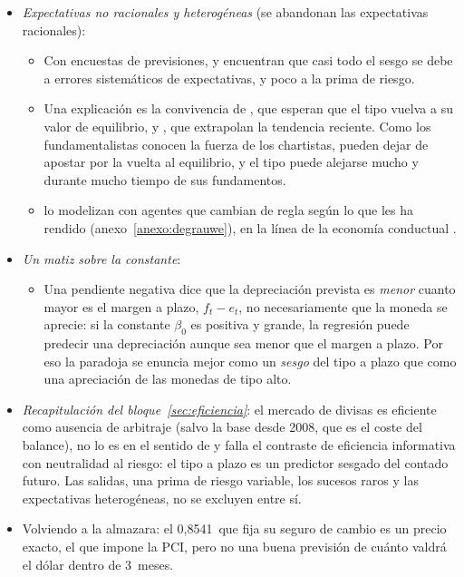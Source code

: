 \documentclass[11pt]{article}
\begin{document}
\begin{itemize}
\begin{itemize}
  \item Explica parte de las ganancias del \emph{carry trade}, que pagan el riesgo de un desplome raro pero grande\nocite{BurnsideEtAl2011Peso}.
  \end{itemize}
\item \emph{Expectativas no racionales y heterogéneas} (se abandonan las expectativas racionales):
  \begin{itemize}
  \item Con encuestas de previsiones, \textcite{FrankelFroot1987Survey} y \textcite{FrootFrankel1989Forward} encuentran que casi todo el sesgo se debe a errores sistemáticos de expectativas, y poco a la prima de riesgo.
  \item Una explicación es la convivencia de , que esperan que el tipo vuelva a su valor de equilibrio, y , que extrapolan la tendencia reciente\nocite{FrankelFroot1990Chartists}. Como los fundamentalistas conocen la fuerza de los chartistas, pueden dejar de apostar por la vuelta al equilibrio, y el tipo puede alejarse mucho y durante mucho tiempo de sus fundamentos.
  \item \textcite{DeGrauweGrimaldi2006} lo modelizan con agentes que cambian de regla según lo que les ha rendido (anexo~\ref{anexo:degrauwe}), en la línea de la economía conductual   .
  \end{itemize}
\item \emph{Un matiz sobre la constante}:
  \begin{itemize}
  \item Una pendiente negativa dice que la depreciación prevista es \emph{menor} cuanto mayor es el margen a plazo, $f_t-e_t$, no necesariamente que la moneda se aprecie: si la constante $\beta_0$ es positiva y grande, la regresión puede predecir una depreciación aunque sea menor que el margen a plazo. Por eso la paradoja se enuncia mejor como un \emph{sesgo} del tipo a plazo que como una apreciación de las monedas de tipo alto\nocite{Hodrick1987Empirical}.
  \end{itemize}
\end{itemize}

\begin{itemize}
\item \emph{Recapitulación del bloque~\ref{sec:eficiencia}}: el mercado de divisas es eficiente como ausencia de arbitraje (salvo la base desde 2008, que es el coste del balance), no lo es en el sentido de  y falla el contraste de eficiencia informativa con neutralidad al riesgo: el tipo a plazo es un predictor sesgado del contado futuro. Las salidas, una prima de riesgo variable, los sucesos raros y las expectativas heterogéneas, no se excluyen entre sí.
\item Volviendo a la almazara: el 0,8541~que fija su seguro de cambio es un precio exacto, el que impone la PCI, pero no una buena previsión de cuánto valdrá el dólar dentro de 3~meses.
\end{itemize}
\end{document}
